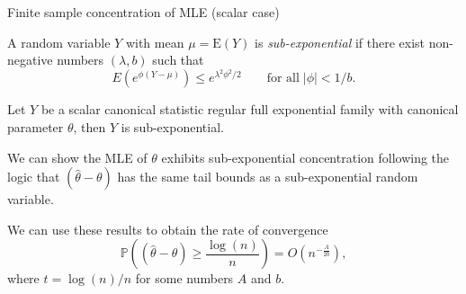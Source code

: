 \documentclass[
  ignorenonframetext,
]{beamer}
\begin{document}
\begin{frame}{Finite sample concentration of MLE (scalar case)}
\protect\hypertarget{finite-sample-concentration-of-mle-scalar-case}{}
\begin{defn}
A random variable $Y$ with mean $\mu = \text{E}(Y)$ is \emph{sub-exponential} if there exist non-negative numbers $(\lambda,b)$ such that 
$$
  E\left(e^{\phi(Y - \mu)}\right) \leq e^{\lambda^2\phi^2/2} 
    \qquad \text{for all} \; |\phi| < 1/b.
$$  
\end{defn}

\vspace{12pt}

Let \(Y\) be a scalar canonical statistic regular full exponential
family with canonical parameter \(\theta\), then \(Y\) is
sub-exponential.
\end{frame}

\begin{frame}{}
\protect\hypertarget{section-7}{}
We can show the MLE of \(\theta\) exhibits sub-exponential concentration
following the logic that \((\hat\theta - \theta)\) has the same tail
bounds as a sub-exponential random variable.

We can use these results to obtain the rate of convergence \[
  \mathbb{P}\left( (\hat\theta - \theta) \geq \frac{\log(n)}{n}\right) 
    = O\left(n^{-\frac{A}{2b}}\right),
\] where \(t = \log(n)/n\) for some numbers \(A\) and \(b\).
\end{frame}
\end{document}
